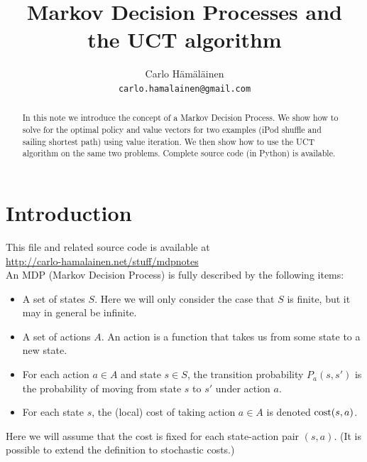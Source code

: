 \documentclass[12pt,amstags,fleqn]{article}
\title{Markov Decision Processes and \\the UCT algorithm}
\author{Carlo H\"{a}m\"{a}l\"{a}inen\\
{\texttt{carlo.hamalainen@gmail.com}}}
\theoremstyle{plain}
\theoremstyle{definition}
\theoremstyle{definition}
\begin{document}
\maketitle

\begin{abstract} 
In this note we introduce the concept of a Markov Decision Process. We
show how to solve for the optimal policy and value vectors for two
examples (iPod shuffle and sailing shortest path) using value
iteration. We then show how to use the UCT algorithm on the same two
problems. Complete source code (in Python) is available.
\end{abstract}

\section{Introduction}

This file and related source code is available at\\
\url{http://carlo-hamalainen.net/stuff/mdpnotes} \\

An MDP (Markov Decision Process) is fully described by the following
items:

\begin{itemize}
\item A set of states $S$. Here we will only consider the case that $S$
is finite, but it may in general be infinite.

\item A set of actions $A$. An action is a function that takes us from
some state to a new state.
\item For each action $a \in A$ and state $s \in S$, the transition
probability $P_a(s,s')$ is the probability of moving from state $s$ to
$s'$ under action $a$.
\item For each state $s$, the (local) cost of taking action $a \in
A$ is denoted $\textnormal{cost}(s,a)$.
\end{itemize}

Here we will assume that the cost is fixed for each state-action pair
$(s,a)$. (It is possible to extend the definition to stochastic costs.)
\end{document}
